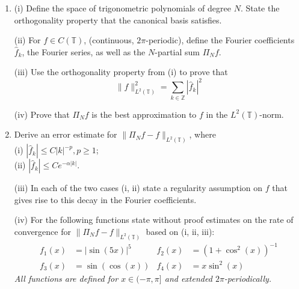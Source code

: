 \documentclass{exams}
\newcommand{\Z}{\mathbb{Z}}
\begin{document}

\def\TT{\mathbb{T}}

\begin{examcomp1}

\clearpage

\begin{question}
  \begin{enumerate}

  \item  (i) Define the space of trigonometric polynomials of degree $N$. State
  the orthogonality property that the canonical basis satisfies.   

  (ii) For $f \in C(\TT)$, (continuous, $2\pi$-periodic), define the
  Fourier coefficients $\hat{f}_k$, the Fourier series, as well as the
  $N$-partial sum $\Pi_N f$.  
  
  (iii) Use the orthogonality property from (i) to prove that  
  \[
      \| f \|_{L^2(\TT)}^2 = \sum_{k \in \Z} |\hat{f}_k|^2  
  \]
  
  (iv) Prove that $\Pi_N f$ is the best approximation to 
  $f$ in the $L^2(\TT)$-norm.  

  \item  Derive an
  error estimate for $\| \Pi_N f - f \|_{L^2(\TT)}$, where  \\ 
  (i) $|\hat{f}_k| \leq C |k|^{-p}, p \geq 1$;  \\  
  (ii) $|\hat{f}_k| \leq C e^{-\alpha |k|}$.   

  (iii) In each of the two cases (i, ii) state a regularity assumption on 
  $f$ that gives rise to this decay in the Fourier coefficients. 

  (iv) For the following functions state without proof estimates on the rate of
  convergence for $\| \Pi_N f - f \|_{L^2(\TT)}$ based on (i, ii, iii):  
  \begin{align*}
    f_1(x) &= |\sin(5x)|^5
    & 
    f_2(x) &= (1 + \cos^2(x))^{-1}
    \\ 
    f_3(x) &= \sin(\cos(x))
    &
    f_4(x) &= x \sin^2(x)
  \end{align*}
  {\it All functions are defined for $x \in (-\pi, \pi]$ and 
  extended $2\pi$-periodically.}


\end{enumerate}
\end{question}
\end{examcomp1}
\end{document}
